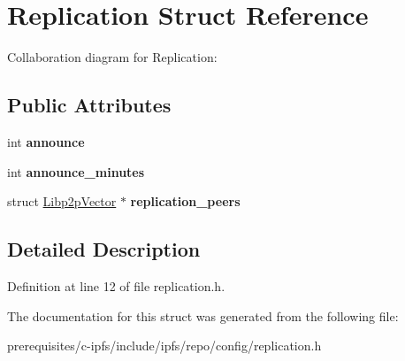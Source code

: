 \hypertarget{struct_replication}{}\section{Replication Struct Reference}
\label{struct_replication}


Collaboration diagram for Replication\+:
\subsection*{Public Attributes}
\begin{DoxyCompactItemize}
\item 
\mbox{\label{struct_replication_abe713e85f440a057cfa4e497dbd7f75f}} 
int {\bfseries announce}
\item 
\mbox{\label{struct_replication_ad6ce9938e5af812f5a1116642d696806}} 
int {\bfseries announce\+\_\+minutes}
\item 
\mbox{\label{struct_replication_a4033191997db83f72fd5860a77f3e524}} 
struct \mbox{\hyperlink{struct_libp2p_vector}{Libp2p\+Vector}} $\ast$ {\bfseries replication\+\_\+peers}
\end{DoxyCompactItemize}


\subsection{Detailed Description}


Definition at line 12 of file replication.\+h.



The documentation for this struct was generated from the following file\+:\begin{DoxyCompactItemize}
\item 
prerequisites/c-\/ipfs/include/ipfs/repo/config/replication.\+h\end{DoxyCompactItemize}
